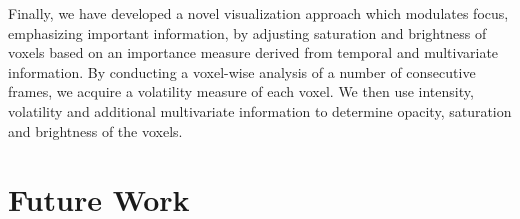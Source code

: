 Finally, we have developed a novel visualization approach which modulates focus, emphasizing important information, by adjusting saturation and brightness of voxels based on an importance measure derived from temporal and multivariate information.
By conducting a voxel-wise analysis of a number of consecutive frames, we acquire a volatility measure of each voxel. We then use intensity, volatility and additional multivariate information to determine opacity, saturation and brightness of the voxels.

\section{Future Work}

